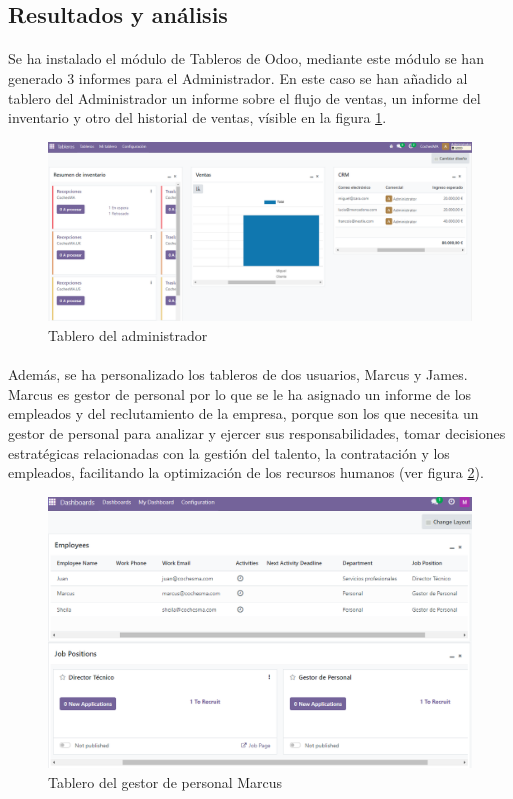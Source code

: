 \subsection{Resultados y análisis}
\paragraph{}
Se ha instalado el módulo de Tableros de Odoo, mediante este módulo se han generado 3 informes para el Administrador. En este caso se han añadido al tablero del Administrador un informe sobre el flujo de ventas, un informe del inventario y otro del historial de ventas, vísible en la figura \ref{admin}. 
\begin{figure}[h]
    \centering
    \includegraphics[width=1\linewidth]{fotosDecisiones/admin.png}
    \caption{Tablero del administrador}
    \label{admin}
\end{figure}
\paragraph{}
Además, se ha personalizado los tableros de dos usuarios, Marcus y James. Marcus es gestor de personal por lo que se le ha asignado un informe de los empleados y del reclutamiento de la empresa, porque son los que necesita un gestor de personal para analizar y ejercer sus responsabilidades, tomar decisiones estratégicas relacionadas con la gestión del talento, la contratación y los empleados, facilitando la optimización de los recursos humanos (ver figura \ref{fig:marcus}). 
\begin{figure}[h]
    \centering
    \includegraphics[width=0.9\linewidth]{fotosDecisiones/marcus.png}
    \caption{Tablero del gestor de personal Marcus}
    \label{fig:marcus}
\end{figure}
